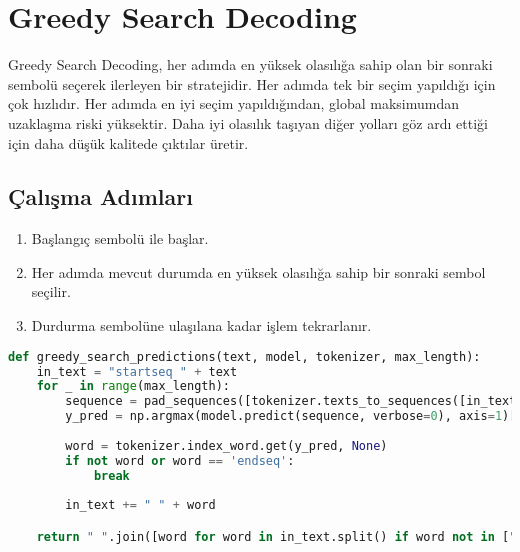 \section{Greedy Search Decoding}
Greedy Search Decoding, her adımda en yüksek olasılığa sahip olan bir sonraki sembolü seçerek ilerleyen bir stratejidir. Her adımda tek bir seçim yapıldığı için çok hızlıdır. Her adımda en iyi seçim yapıldığından, global maksimumdan uzaklaşma riski yüksektir. Daha iyi olasılık taşıyan diğer yolları göz ardı ettiği için daha düşük kalitede çıktılar üretir. 

\subsection{Çalışma Adımları}
\begin{enumerate}
	\item Başlangıç sembolü ile başlar.
	\item Her adımda mevcut durumda en yüksek olasılığa sahip bir sonraki sembol seçilir.
	\item Durdurma sembolüne ulaşılana kadar işlem tekrarlanır.
\end{enumerate}

\begin{lstlisting}[language=Python]
def greedy_search_predictions(text, model, tokenizer, max_length):
    in_text = "startseq " + text
    for _ in range(max_length):
        sequence = pad_sequences([tokenizer.texts_to_sequences([in_text])[0]], max_length)
        y_pred = np.argmax(model.predict(sequence, verbose=0), axis=1)[0]
        
        word = tokenizer.index_word.get(y_pred, None)
        if not word or word == 'endseq':
            break
    
        in_text += " " + word

    return " ".join([word for word in in_text.split() if word not in ["startseq", "endseq", "<OOV>"]])
\end{lstlisting}

\newpage